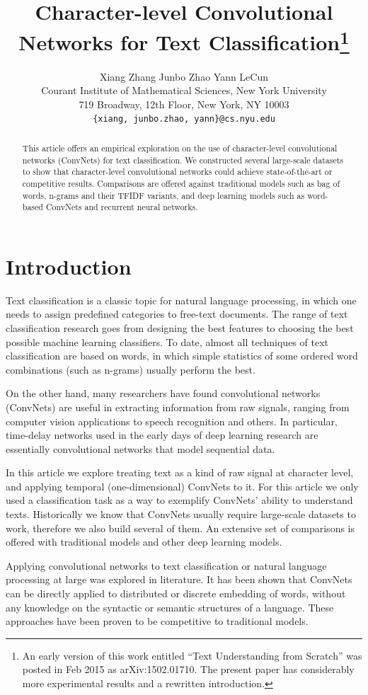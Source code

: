 \documentclass{article} %
\title{Character-level Convolutional Networks for Text Classification\thanks{An early version of this work entitled ``Text Understanding from Scratch'' was posted in Feb 2015 as arXiv:1502.01710. The present paper has considerably more experimental results and a rewritten introduction.}}
\author{
  Xiang Zhang \qquad Junbo Zhao \qquad Yann LeCun \\
  Courant Institute of Mathematical Sciences, New York University \\
  719 Broadway, 12th Floor, New York, NY 10003 \\
\texttt{\{xiang, junbo.zhao, yann\}@cs.nyu.edu} \\
}
\begin{document}
\maketitle

\begin{abstract}
This article offers an empirical exploration on the use of character-level convolutional networks (ConvNets) for text classification. We constructed several large-scale datasets to show that character-level convolutional networks could achieve state-of-the-art or competitive results. Comparisons are offered against traditional models such as bag of words, n-grams and their TFIDF variants, and deep learning models such as word-based ConvNets and recurrent neural networks.
\end{abstract}

\section{Introduction}

Text classification is a classic topic for natural language processing, in which one needs to assign predefined categories to free-text documents. The range of text classification research goes from designing the best features to choosing the best possible machine learning classifiers. To date, almost all techniques of text classification are based on words, in which simple statistics of some ordered word combinations (such as n-grams) usually perform the best\cite{J98}.

On the other hand, many researchers have found convolutional networks (ConvNets)\cite{LBDHHHJ89}\cite{LBBH98} are useful in extracting information from raw signals, ranging from computer vision applications to speech recognition and others. In particular, time-delay networks used in the early days of deep learning research are essentially convolutional networks that model sequential data\cite{BFBL89}\cite{WHHSL89}.

In this article we explore treating text as a kind of raw signal at character level, and applying temporal (one-dimensional) ConvNets to it. For this article we only used a classification task as a way to exemplify ConvNets' ability to understand texts. Historically we know that ConvNets usually require large-scale datasets to work, therefore we also build several of them. An extensive set of comparisons is offered with traditional models and other deep learning models.

Applying convolutional networks to text classification or natural language processing at large was explored in literature. It has been shown that ConvNets can be directly applied to distributed\cite{SG14}\cite{K14} or discrete\cite{JZ14} embedding of words, without any knowledge on the syntactic or semantic structures of a language. These approaches have been proven to be competitive to traditional models.
\end{document}
